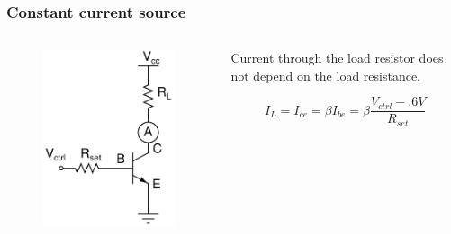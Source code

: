 \documentclass[beamer]{standalone}
\begin{document}
\begin{frame}
\frametitle{Constant current source}
 \begin{columns}[c]
  \begin{column}{.35\textwidth}
   \begin{figure}
    \includegraphics[height=0.60\textheight]{./schematics/npn_constant_current_source.pdf}
   \end{figure}

  \end{column}
  \begin{column}{.65\textwidth}
   Current through the load resistor does not depend on the load
   resistance.

   \begin{equation*}
    I_L= I_{ce} = \beta I_{be} = \beta \frac{V_{ctrl}-.6V}{R_{set}} 
   \end{equation*}




  \end{column}
 \end{columns}
\end{frame}
 
\end{document}
